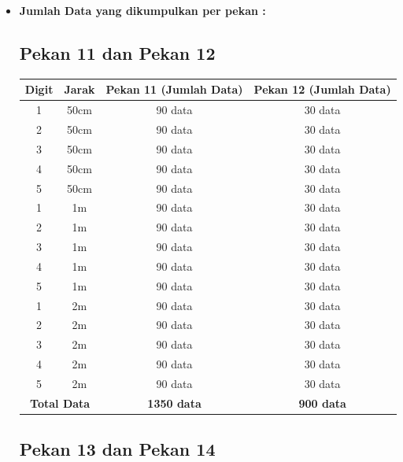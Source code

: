 \documentclass[12pt,a4paper]{article}
\begin{document}
\begin{itemize}
\begin{itemize}
    \item \textbf{Jumlah Data yang dikumpulkan per pekan :}

    \renewcommand{\arraystretch}{1.5} %

\subsection*{Pekan 11 dan Pekan 12}

\begin{tabular}{|c|c|c|c|}
\hline
\textbf{Digit} & \textbf{Jarak} & \textbf{Pekan 11 (Jumlah Data)} & \textbf{Pekan 12 (Jumlah Data)} \\ \hline
1 & 50cm & 90 data & 30 data \\ \hline
2 & 50cm & 90 data & 30 data \\ \hline
3 & 50cm & 90 data & 30 data \\ \hline
4 & 50cm & 90 data & 30 data \\ \hline
5 & 50cm & 90 data & 30 data \\ \hline
1 & 1m & 90 data & 30 data \\ \hline
2 & 1m & 90 data & 30 data \\ \hline
3 & 1m & 90 data & 30 data \\ \hline
4 & 1m & 90 data & 30 data \\ \hline
5 & 1m & 90 data & 30 data \\ \hline
1 & 2m & 90 data & 30 data \\ \hline
2 & 2m & 90 data & 30 data \\ \hline
3 & 2m & 90 data & 30 data \\ \hline
4 & 2m & 90 data & 30 data \\ \hline
5 & 2m & 90 data & 30 data \\ \hline
\multicolumn{2}{|c|}{\textbf{Total Data}} & \textbf{1350 data} & \textbf{900 data} \\ \hline
\end{tabular}

\renewcommand{\arraystretch}{1.5} %

\subsection*{Pekan 13 dan Pekan 14}


\end{itemize}
\end{itemize}
\end{document}
